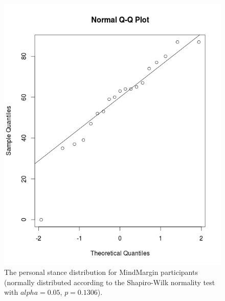 \begin{figure}[h]
\centering
\includegraphics[scale=0.25]{mm_normal.png}
\caption{The personal stance distribution for MindMargin participants (normally distributed according to the Shapiro-Wilk normality test with $alpha=0.05$, $p=0.1306$).}
\label{fig:mm_normal}
\end{figure}

